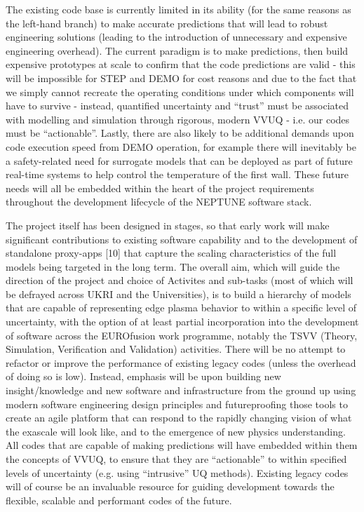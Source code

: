 \documentclass{article}
\begin{document}
\vspace{24pt}
\leftskip=-14pt
The existing code base is currently limited in its ability (for the same reasons 
as the left-hand branch) to make accurate predictions that will lead to robust 
engineering solutions (leading to the introduction of unnecessary and expensive 
engineering overhead). The current paradigm is to make predictions, then build 
expensive prototypes at scale to confirm that the code predictions are valid - 
this will be impossible for STEP and DEMO for cost reasons and due to the fact 
that we simply cannot recreate the operating conditions under which components 
will have to survive - instead, quantified uncertainty and ``trust'' must be associated 
with modelling and simulation through rigorous, modern VVUQ - i.e. our codes must 
be ``actionable''. Lastly, there are also likely to be additional demands upon 
code execution speed from DEMO operation, for example there will inevitably be 
a safety-related need for surrogate models that can be deployed as part of future 
real-time systems to help control the temperature of the first wall. These future 
needs will all be embedded within the heart of the project requirements throughout 
the development lifecycle of the NEPTUNE software stack. 

\vspace{24pt}
The project itself has been designed in stages, so that early work will make significant 
contributions to existing software capability and to the development of standalone 
proxy-apps{\color{color29}  [10] that capture the }scaling characteristics of the 
full models being targeted in the long term. The overall aim, which will guide 
the direction of the project and choice of Activites and sub-tasks (most of which 
will be defrayed across UKRI and the Universities), is to build a hierarchy of 
models that are capable of representing edge plasma behavior to within a specific 
level of uncertainty, with the option of at least partial incorporation into the 
development of software across the EUROfusion work programme, notably the TSVV 
(Theory, Simulation, Verification and Validation) activities. There will be no 
attempt to refactor or improve the performance of existing legacy codes (unless 
the overhead of doing so is low). Instead, emphasis will be upon building new insight/knowledge 
and new software and infrastructure from the ground up using modern software engineering 
design principles and futureproofing those tools to create an agile platform that 
can respond to the rapidly changing vision of what the exascale will look like, 
and to the emergence of new physics understanding. All codes that are capable of 
making predictions will have embedded within them the concepts of VVUQ, to ensure 
that they are ``actionable'' to within specified levels of uncertainty (e.g. using 
``intrusive'' UQ methods). Existing legacy codes will of course be an invaluable 
resource for guiding development towards the flexible, scalable and performant 
codes of the future.
\end{document}
